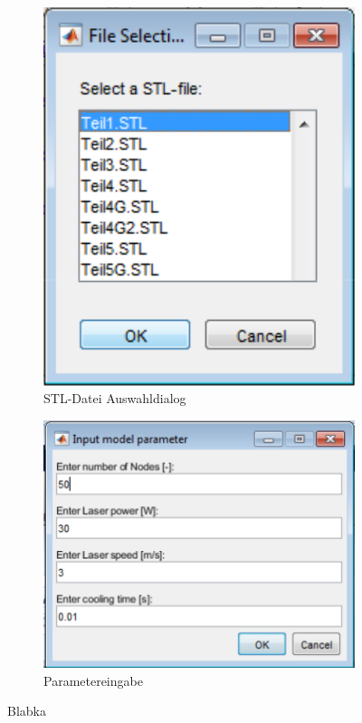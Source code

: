 \documentclass{scrartcl}
\begin{document}
\begin{figure}
\centering
\begin{subfigure}[t]{0.4\textwidth}
\centering
\includegraphics[width=\textwidth]{bild2.png}
\caption{STL-Datei Auswahldialog}
\label{fig:1}
\end{subfigure}
\begin{subfigure}[t]{0.55\textwidth}
\centering
\includegraphics[width=\textwidth]{bild1.png}
\caption{Parametereingabe}
\label{fig:2}
\end{subfigure}
\caption{Blabka}
\end{figure}
\end{document}
